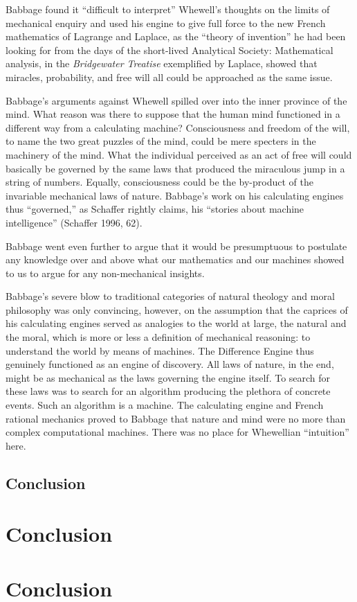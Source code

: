 \documentclass[version=last,draft=true,paper=A4,portrait,twoside=true,twocolumn=false,headinclude=false,footinclude=false,fontsize=12,BCOR=20mm,DIV=calc,pagesize=auto,titlepage=firstiscover,mpinclude=true,open=right,chapterprefix=true,numbers=autoendperiod,headsepline=false,headings=twolinechapter,parskip=false]{scrbook}
\begin{document}
Babbage found it ``difficult to interpret'' Whewell's thoughts on the
limits of mechanical enquiry and used his engine to give full force to the
new French mathematics of Lagrange and Laplace, as the ``theory of
invention'' he had been looking for from the days of the short-lived
Analytical Society: Mathematical analysis, in the \emph{Bridgewater Treatise}
exemplified by Laplace, showed that miracles, probability, and free will
all could be approached as the same issue. 

Babbage's arguments against Whewell spilled over into the inner province of
the mind. What reason was there to suppose that the human mind functioned
in a different way from a calculating machine? Consciousness and freedom of
the will, to name the two great puzzles of the mind, could be mere specters
in the machinery of the mind. What the individual perceived as an act of
free will could basically be governed by the same laws that produced the
miraculous jump in a string of numbers. Equally, consciousness could be the
by-product of the invariable mechanical laws of nature. Babbage's work on
his calculating engines thus ``governed,'' as Schaffer rightly claims, his
``stories about machine intelligence'' (Schaffer 1996, 62).

Babbage went even further to argue that it would be presumptuous to
postulate any knowledge over and above what our mathematics and our
machines showed to us to argue for any non-mechanical insights. 

Babbage's severe blow to traditional categories of natural theology and
moral philosophy was only convincing, however, on the assumption that the
caprices of his calculating engines served as analogies to the world at
large, the natural and the moral, which is more or less a definition of
mechanical reasoning: to understand the world by means of machines. The
Difference Engine thus genuinely functioned as an engine of discovery. All
laws of nature, in the end, might be as mechanical as the laws governing
the engine itself. To search for these laws was to search for an algorithm
producing the plethora of concrete events. Such an algorithm is a machine.
The calculating engine and French rational mechanics proved to Babbage that
nature and mind were no more than complex computational machines. There was
no place for Whewellian ``intuition'' here.
\section{Conclusion}
\label{sec:orgeba1a18}
\chapter{Conclusion}
\label{sec:org40ff2b2}
\lipsum

\backmatter
\chapter{Conclusion} 
\lipsum

\printbibliography
\end{document}
